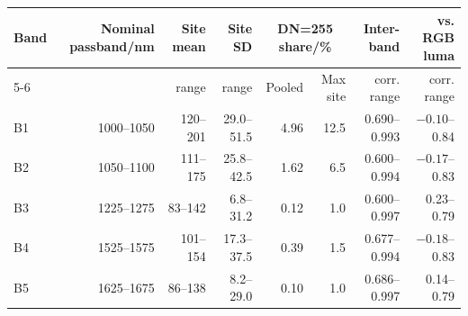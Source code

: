 \begin{tabular}{@{}lrrrrrrr@{}}
\toprule
Band & Nominal passband/nm & Site mean & Site SD & \multicolumn{2}{c}{DN=255 share/\%} & Inter-band & vs. RGB luma\\
\cmidrule(lr){5-6}
 & & range & range & Pooled & Max site & corr. range & corr. range\\
\midrule
B1 & 1000--1050 & 120--201 & 29.0--51.5 & 4.96 & 12.5 & 0.690--0.993 & $-0.10$--0.84 \\
B2 & 1050--1100 & 111--175 & 25.8--42.5 & 1.62 & 6.5 & 0.600--0.994 & $-0.17$--0.83 \\
B3 & 1225--1275 & 83--142 & 6.8--31.2 & 0.12 & 1.0 & 0.600--0.997 & 0.23--0.79 \\
B4 & 1525--1575 & 101--154 & 17.3--37.5 & 0.39 & 1.5 & 0.677--0.994 & $-0.18$--0.83 \\
B5 & 1625--1675 & 86--138 & 8.2--29.0 & 0.10 & 1.0 & 0.686--0.997 & 0.14--0.79 \\
\bottomrule
\end{tabular}
